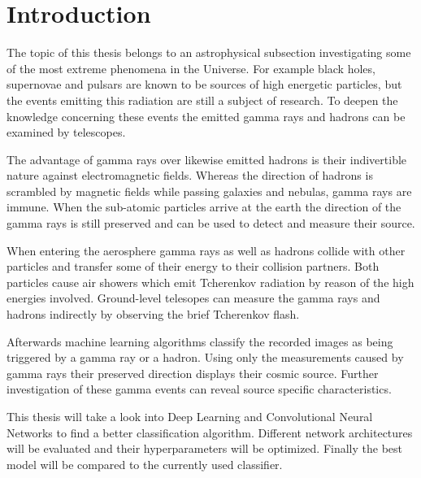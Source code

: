 \chapter{Introduction}
The topic of this thesis belongs to an astrophysical subsection investigating some of the most extreme phenomena in the Universe.
For example black holes, supernovae and pulsars are known to be sources of high energetic particles,
but the events emitting this radiation are still a subject of research.
To deepen the knowledge concerning these events the emitted gamma rays and hadrons can be examined by telescopes.

The advantage of gamma rays over likewise emitted hadrons is their indivertible nature against electromagnetic fields.
Whereas the direction of hadrons is scrambled by magnetic fields while passing galaxies and nebulas, gamma rays are immune.
When the sub-atomic particles arrive at the earth the direction of the gamma rays is still preserved
and can be used to detect and measure their source.

When entering the aerosphere gamma rays as well as hadrons collide with other particles
and transfer some of their energy to their collision partners.
Both particles cause air showers which emit Tcherenkov radiation by reason of the high energies involved.
Ground-level telesopes can measure the gamma rays and hadrons indirectly by observing the brief Tcherenkov flash.

Afterwards machine learning algorithms classify the recorded images as being triggered by a gamma ray or a hadron.
Using only the measurements caused by gamma rays their preserved direction displays their cosmic source.
Further investigation of these gamma events can reveal source specific characteristics.

This thesis will take a look into Deep Learning and Convolutional Neural Networks to find a better classification algorithm.
Different network architectures will be evaluated and their hyperparameters will be optimized.
Finally the best model will be compared to the currently used classifier.
